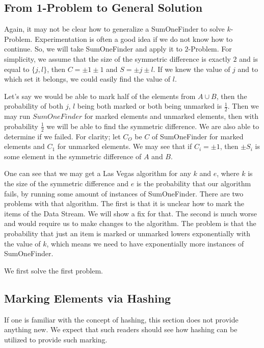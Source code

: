 \subsection{From 1-Problem to General Solution}

Again, it may not be clear how to generalize a SumOneFinder to solve \(k\)-Problem. Experimentation is often a good idea if we do not know how to continue. So, we will take SumOneFinder and apply it to \(2\)-Problem. For simplicity, we assume that the size of the symmetric difference is exactly \(2\) and is equal to \(\{j,l\}\), then \(C=\pm 1 \pm 1\) and \(S = \pm j \pm l\). If we knew the value of \(j\) and to which set it belongs, we could easily find the value of \(l\). 

Let's say we would be able to mark half of the elements from \(A\cup B\), then the probability of both \(j\), \(l\) being both marked or both being unmarked is \(\frac{1}{2}\). Then we may run \(SumOneFinder\) for marked elements and unmarked elements, then with probability \(\frac{1}{2}\) we will be able to find the symmetric difference. We are also able to determine if we failed. For clarity; let \(C_O\) be \(C\) of SumOneFinder for marked elements and \(C_1\) for unmarked elements. We may see that if \(C_i = \pm 1\), then \(\pm S_i\) is some element in the symmetric difference of \(A\) and \(B\).

One can see that we may get a Las Vegas algorithm for any \(k\) and \(e\), where \(k\) is the size of the symmetric difference and \(e\) is the probability that our algorithm fails, by running some amount of instances of SumOneFinder. There are two problems with that algorithm. The first is that it is unclear how to mark the items of the Data Stream. We will show a fix for that. The second is much worse and would require us to make changes to the algorithm. The problem is that the probability that just an item is marked or unmarked lowers exponentially with the value of \(k\), which means we need to have exponentially more instances of SumOneFinder.

We first solve the first problem.

\subsection{Marking Elements via Hashing}

If one is familiar with the concept of hashing, this section does not provide anything new. We expect that such readers should see how hashing can be utilized to provide such marking. 


\section{}